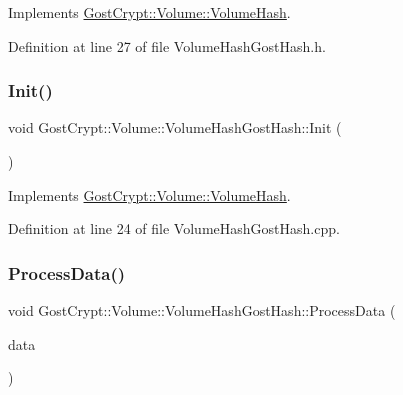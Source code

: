 Implements \hyperlink{class_gost_crypt_1_1_volume_1_1_volume_hash_a7f565609ef9bd178423575603b252d33}{Gost\+Crypt\+::\+Volume\+::\+Volume\+Hash}.



Definition at line 27 of file Volume\+Hash\+Gost\+Hash.\+h.

\mbox{\label{class_gost_crypt_1_1_volume_1_1_volume_hash_gost_hash_a591b1b6b6056ef1b758a841bacacc931}} 
\subsubsection{\texorpdfstring{Init()}{Init()}}
{\footnotesize\ttfamily void Gost\+Crypt\+::\+Volume\+::\+Volume\+Hash\+Gost\+Hash\+::\+Init (\begin{DoxyParamCaption}{ }\end{DoxyParamCaption})\hspace{0.3cm}{\ttfamily [virtual]}}



Implements \hyperlink{class_gost_crypt_1_1_volume_1_1_volume_hash_a7167d7316a705369d8bc4e1cc5f2e61e}{Gost\+Crypt\+::\+Volume\+::\+Volume\+Hash}.



Definition at line 24 of file Volume\+Hash\+Gost\+Hash.\+cpp.

\mbox{\label{class_gost_crypt_1_1_volume_1_1_volume_hash_gost_hash_aa4e7b1f157512edc4fc184ffd5d15c27}} 
\subsubsection{\texorpdfstring{Process\+Data()}{ProcessData()}}
{\footnotesize\ttfamily void Gost\+Crypt\+::\+Volume\+::\+Volume\+Hash\+Gost\+Hash\+::\+Process\+Data (\begin{DoxyParamCaption}\item[{const \hyperlink{class_gost_crypt_1_1_buffer_ptr}{Buffer\+Ptr} \&}]{data }\end{DoxyParamCaption})\hspace{0.3cm}{\ttfamily [virtual]}}




